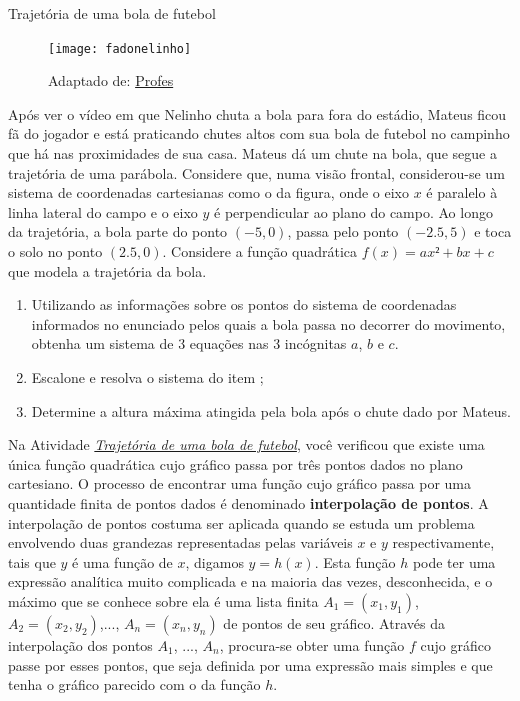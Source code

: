 \begin{task}{Trajetória de uma bola de futebol}
\label{trajetoria}
\begin{figure}[H]
\centering
\noindent\texttt{[image: fadonelinho]}
\caption{Adaptado de: \href{https://profes.com.br/felipes.rocha/blog/lancamento-obliquo-e-o-futebol}{Profes}}
\end{figure}

Após ver o vídeo em que Nelinho chuta a bola para fora do estádio, Mateus ficou fã do jogador e está praticando chutes altos com sua bola de futebol no campinho que há nas proximidades de sua casa. Mateus dá um chute na bola, que segue a trajetória de uma parábola. Considere que, numa visão frontal, considerou-se um sistema de coordenadas cartesianas como o da figura, onde o eixo $x$ é paralelo à linha lateral do campo e o eixo $y$ é perpendicular ao plano do campo. Ao longo da trajetória, a bola parte do ponto $(-5,0)$, passa pelo ponto $(-2.5, 5)$ e toca o solo no ponto $(2.5, 0)$. Considere a função quadrática $f(x) = ax²+bx+c$ que modela a trajetória da bola.

\begin{enumerate}
\item{}
Utilizando as informações sobre os pontos do sistema de coordenadas informados no enunciado pelos quais a bola passa no decorrer do movimento, obtenha um sistema de 3 equações nas 3 incógnitas $a$, $b$ e $c$.

\item{}
Escalone e resolva o sistema do item ;

\item{}
Determine a altura máxima atingida pela bola após o chute dado por Mateus.

\end{enumerate}




\end{task}



 Na Atividade \textit{\hyperref[trajetoria]{Trajetória de uma bola de futebol}}, você verificou que existe uma única função quadrática cujo gráfico passa por três pontos dados no plano cartesiano. O processo de encontrar uma função cujo gráfico passa por uma quantidade finita de pontos dados é denominado \textbf{interpolação de pontos}. A interpolação de pontos costuma ser aplicada quando se estuda um problema envolvendo duas grandezas representadas pelas variáveis $x$ e $y$ respectivamente, tais que $y$ é uma função de $x$, digamos $y = h(x)$. Esta função $h$ pode ter uma expressão analítica muito complicada e na maioria das vezes, desconhecida, e o máximo que se conhece sobre ela é uma lista finita $A_1 = (x_1, y_1)$, $A_2 = (x_2, y_2)$,..., $A_n = (x_n, y_n)$ de pontos de seu gráfico. Através da interpolação dos pontos $A_1$, ..., $A_n$, procura-se obter uma função $f$ cujo gráfico passe por esses pontos, que seja definida por uma expressão mais simples e que tenha o gráfico parecido com o da função $h$.  
 
